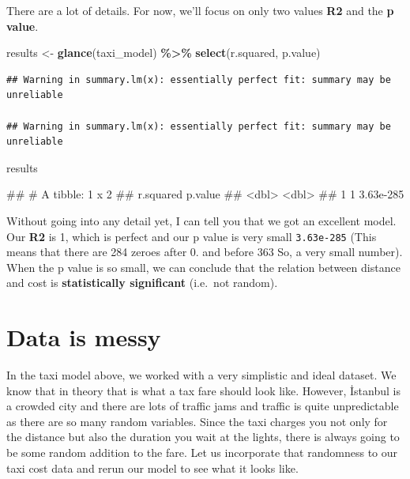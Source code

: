 \documentclass[
]{book}
\newenvironment{Shaded}{\begin{snugshade}}{\end{snugshade}}
\newcommand{\FunctionTok}[1]{\textcolor[rgb]{0.13,0.29,0.53}{\textbf{#1}}}
\newcommand{\NormalTok}[1]{#1}
\newcommand{\OtherTok}[1]{\textcolor[rgb]{0.56,0.35,0.01}{#1}}
\newcommand{\SpecialCharTok}[1]{\textcolor[rgb]{0.81,0.36,0.00}{\textbf{#1}}}
\begin{document}
There are a lot of details. For now, we'll focus on only two values \textbf{R2} and the \textbf{p value}.

\begin{Shaded}
\begin{Highlighting}[]
\NormalTok{results }\OtherTok{\textless{}{-}} \FunctionTok{glance}\NormalTok{(taxi\_model) }\SpecialCharTok{\%\textgreater{}\%}
  \FunctionTok{select}\NormalTok{(r.squared, p.value)}
\end{Highlighting}
\end{Shaded}

\begin{verbatim}
## Warning in summary.lm(x): essentially perfect fit: summary may be unreliable

## Warning in summary.lm(x): essentially perfect fit: summary may be unreliable
\end{verbatim}

\begin{Shaded}
\begin{Highlighting}[]
\NormalTok{results}
\end{Highlighting}
\end{Shaded}

\begin{Shaded}
\begin{Highlighting}[]
\NormalTok{\#\# \# A tibble: 1 x 2}
\NormalTok{\#\#   r.squared   p.value}
\NormalTok{\#\#       \textless{}dbl\textgreater{}     \textless{}dbl\textgreater{}}
\NormalTok{\#\# 1         1 3.63e{-}285}
\end{Highlighting}
\end{Shaded}

Without going into any detail yet, I can tell you that we got an excellent model. Our \textbf{R2} is 1, which is perfect and our p value is very small \texttt{3.63e-285} (This means that there are 284 zeroes after 0. and before 363 So, a very small number). When the p value is so small, we can conclude that the relation between distance and cost is \textbf{statistically significant} (i.e.~not random).

\section{Data is messy}\label{data-is-messy}

In the taxi model above, we worked with a very simplistic and ideal dataset. We know that in theory that is what a tax fare should look like. However, İstanbul is a crowded city and there are lots of traffic jams and traffic is quite unpredictable as there are so many random variables. Since the taxi charges you not only for the distance but also the duration you wait at the lights, there is always going to be some random addition to the fare. Let us incorporate that randomness to our taxi cost data and rerun our model to see what it looks like.
\end{document}
